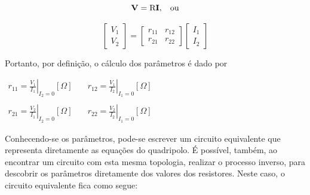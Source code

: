 \documentclass{article}
\numberwithin{equation}{section}
\begin{document}
\begin{equation*}
    \textbf{V}=\text{R}\textbf{I}, \hspace{0.3cm} \text{ou}
\end{equation*}

\begin{equation}
    \begin{bmatrix}
        V_{1} \\
        V_{2}
    \end{bmatrix}
    = %
    \begin{bmatrix}
        r_{11} & r_{12} \\
        r_{21} & r_{22}
    \end{bmatrix}
    \begin{bmatrix}
        I_{1} \\
        I_{2}
    \end{bmatrix}
\end{equation}

Portanto, por definição, o cálculo dos parâmetros é dado por
\begin{center}
    $\begin{matrix} %
            r_{11}=\displaystyle\left.\frac{V_{1}}{I_{1}}\right|_{I_{2}=0} [\Omega] & \quad r_{12}=\displaystyle\left.\frac{V_{1}}{I_{2}}\right|_{I_{1}=0} [\Omega]\\ \\
            r_{21}=\displaystyle\left.\frac{V_{2}}{I_{1}}\right|_{I_{2}=0} [\Omega] & \quad  r_{22}=\displaystyle\left.\frac{V_{2}}{I_{2}}\right|_{I_{1}=0} [\Omega]
    \end{matrix}$
\end{center}

Conhecendo-se os parâmetros, pode-se escrever um circuito equivalente que representa diretamente as equações do quadripolo. É possível, também, ao encontrar um circuito com esta mesma topologia, realizar o processo inverso, para descobrir os parâmetros diretamente dos valores dos resistores. Neste caso, o circuito equivalente fica como segue:

\begin{center}
\end{center}
\end{document}
